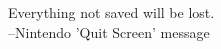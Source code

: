 
\begin{dedication}
{\large{Everything not saved will be lost.}}\\[5mm]
--Nintendo 'Quit Screen' message
\end{dedication}

